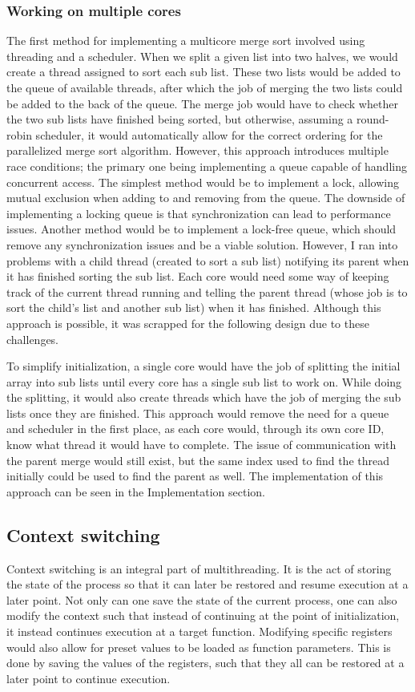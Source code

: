 \subsubsection*{Working on multiple cores}
The first method for implementing a multicore merge sort involved using
threading and a scheduler. When we split a given list into two halves, we would
create a thread assigned to sort each sub list. These two lists would be added
to the queue of available threads, after which the job of merging the two lists
could be added to the back of the queue. The merge job would have to check
whether the two sub lists have finished being sorted, but otherwise, assuming a
round-robin scheduler, it would automatically allow for the correct ordering for
the parallelized merge sort algorithm. However, this approach introduces
multiple race conditions; the primary one being implementing a queue capable of
handling concurrent access. The simplest method would be to implement a lock,
allowing mutual exclusion when adding to and removing from the queue. The
downside of implementing a locking queue is that synchronization can lead to
performance issues. Another method would be to implement a lock-free queue,
which should remove any synchronization issues and be a viable solution.
However, I ran into problems with a child thread (created to sort a sub list)
notifying its parent when it has finished sorting the sub list. Each core would
need some way of keeping track of the current thread running and telling the
parent thread (whose job is to sort the child's list and another sub list) when
it has finished. Although this approach is possible, it was scrapped for the
following design due to these challenges.

To simplify initialization, a single core would have the job of splitting the
initial array into sub lists until every core has a single sub list to work on.
While doing the splitting, it would also create threads which have the job of
merging the sub lists once they are finished. This approach would remove the
need for a queue and scheduler in the first place, as each core would, through
its own core ID, know what thread it would have to complete. The issue of
communication with the parent merge would still exist, but the same index used
to find the thread initially could be used to find the parent as well. The
implementation of this approach can be seen in the Implementation section.


\subsection{Context switching}\label{sec:context_switch}
Context switching is an integral part of multithreading. It is the act of
storing the state of the process so that it can later be restored and resume
execution at a later point. Not only can one save the state of the current
process, one can also modify the context such that instead of continuing at the
point of initialization, it instead continues execution at a target function.
Modifying specific registers would also allow for preset values to be loaded as
function parameters. This is done by saving the values of the registers, such
that they all can be restored at a later point to continue execution.

